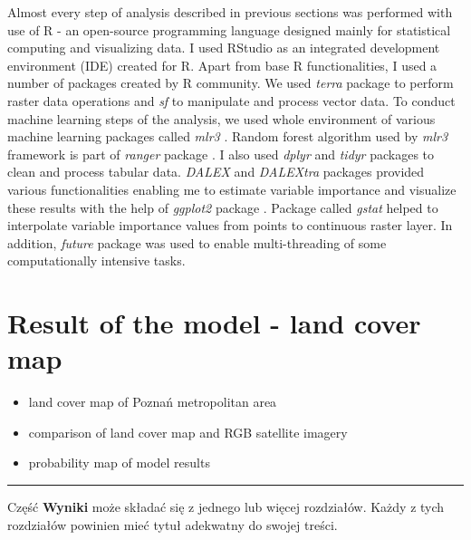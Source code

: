 \documentclass{amuthesis}
\begin{document}
Almost every step of analysis described in previous sections was
performed with use of R \autocite{R-base} - an open-source programming
language designed mainly for statistical computing and visualizing data.
I used RStudio \autocite{rstudio_team_rstudio_2020} as an integrated
development environment (IDE) created for R. Apart from base R
functionalities, I used a number of packages created by R community. We
used \emph{terra} package \autocite{R-terra} to perform raster data
operations and \emph{sf} \autocite{R-sf} to manipulate and process
vector data. To conduct machine learning steps of the analysis, we used
whole environment of various machine learning packages called
\emph{mlr3} \autocite{R-mlr3}. Random forest algorithm used by
\emph{mlr3} framework is part of \emph{ranger} package
\autocite{R-ranger} . I also used \emph{dplyr} \autocite{R-dplyr} and
\emph{tidyr} packages \autocite{R-tidyr} to clean and process tabular
data. \emph{DALEX} \autocite{R-DALEX} and \emph{DALEXtra}
\autocite{R-DALEXtra} packages provided various functionalities enabling
me to estimate variable importance and visualize these results with the
help of \emph{ggplot2} package \autocite{R-ggplot2}. Package called
\emph{gstat} \autocite{R-gstat} helped to interpolate variable
importance values from points to continuous raster layer. In addition,
\emph{future} package \autocite{R-future} was used to enable
multi-threading of some computationally intensive tasks.


\hypertarget{sec-results-map}{%
\chapter{Result of the model - land cover map}\label{sec-results-map}}

\begin{itemize}
\item
  land cover map of Poznań metropolitan area
\item
  comparison of land cover map and RGB satellite imagery
\item
  probability map of model results
\end{itemize}

\begin{center}\rule{0.5\linewidth}{0.5pt}\end{center}

Część \textbf{Wyniki} może składać się z jednego lub więcej rozdziałów.
Każdy z tych rozdziałów powinien mieć tytuł adekwatny do swojej treści.
\end{document}
